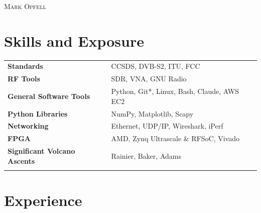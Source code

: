 \documentclass[a4paper, oneside, final]{scrartcl}
\begin{document}
\begin{center} %

\pdfpageheight 11in 
\pdfpagewidth 8.5in


{\fontsize{36}{36}\selectfont\scshape Mark Opfell} 
\vspace{1.16 cm} %


\section{Skills and Exposure}
\begin{tabular}{ @{} >{\bfseries}l @{\hspace{6ex}} l }
Standards & CCSDS, DVB-S2, ITU, FCC\\
RF Tools & SDR, VNA, GNU Radio\\%
General Software Tools & Python, Git*, Linux, Bash, Claude, AWS EC2\\%
Python Libraries & NumPy, Matplotlib, Scapy\\%
Networking & Ethernet, UDP/IP, Wireshark, iPerf\\ %
FPGA & AMD, Zynq Ultrascale \& RFSoC, Vivado\\
Significant Volcano Ascents &  Rainier, Baker, Adams\\%
\\
\end{tabular}

\section{Experience}


\end{center}
\end{document}
